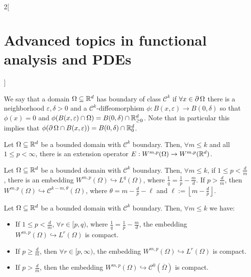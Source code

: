 \documentclass[../../../main_math.tex]{subfiles}
\begin{document}
\begin{multicols}{2}[\section{Advanced topics in functional analysis and PDEs}]
\begin{remark}
  \end{remark}
  \begin{definition}
    We say that a domain $\Omega\subseteq \mathbb{R}^d$ has boundary of class $\mathcal{C}^k$ if $\forall x\in \operatorname{\partial}{\Omega}$ there is a neighborhood $\varepsilon,\delta>0$ and a $\mathcal{C}^k$-diffeomorphism $\phi:B(x,\varepsilon)\to B(0,\delta)$ so that $\phi(x)=0$ and $\phi(B(x,\varepsilon)\cap \Omega)=B(0,\delta)\cap \mathbb{R}_{\geq 0}^d$. Note that in particular this implies that $\phi(\operatorname{\partial}{\Omega}\cap B(x,\varepsilon))=B(0,\delta)\cap \mathbb{R}_0^d$.
  \end{definition}
  \begin{theorem}
    Let $\Omega\subseteq \mathbb{R}^d$ be a bounded domain with $\mathcal{C}^k$ boundary. Then, $\forall m\leq k$ and all $1\leq p<\infty$, there is an extension operator $E:W^{m,p}(\Omega)\to W^{m,p}(\mathbb{R}^d)$.
  \end{theorem}
  \begin{theorem}
    Let $\Omega\subseteq \mathbb{R}^d$ be a bounded domain with $\mathcal{C}^k$ boundary. Then, $\forall m\leq k$, if $1\leq p<\frac{d}{m}$,
    there is an embedding $W^{m,p}(\Omega)\hookrightarrow L^q(\Omega)$, where $\displaystyle\frac{1}{q}=\frac{1}{p}-\frac{m}{d}$. If $p>\frac{d}{m}$, then $W^{m,p}(\Omega)\hookrightarrow \mathcal{C}^{k-m,\theta}(\Omega)$, where $\theta=m-\frac{d}{p}-\ell$ and $\ell:=\left\lfloor m-\frac{d}{p}\right\rfloor$.
  \end{theorem}
  \begin{theorem}
    Let $\Omega\subseteq \mathbb{R}^d$ be a bounded domain with $\mathcal{C}^k$ boundary. Then, $\forall m\leq k$ we have:
    \begin{itemize}
      \item If $1\leq p<\frac{d}{m}$, $\forall r\in [p,q)$, where $\displaystyle\frac{1}{q}=\frac{1}{p}-\frac{m}{d}$, the embedding $W^{m,p}(\Omega)\hookrightarrow L^r(\Omega)$ is compact.
      \item If $p\geq \frac{d}{m}$, then $\forall r\in [p,\infty)$, the embedding $W^{m,p}(\Omega)\hookrightarrow L^r(\Omega)$ is compact.
      \item If $p>\frac{d}{m}$, then the embedding $W^{m,p}(\Omega)\hookrightarrow \mathcal{C}^{0}(\overline{\Omega})$ is compact.
    \end{itemize}
  \end{theorem}

\end{multicols}
\end{document}
